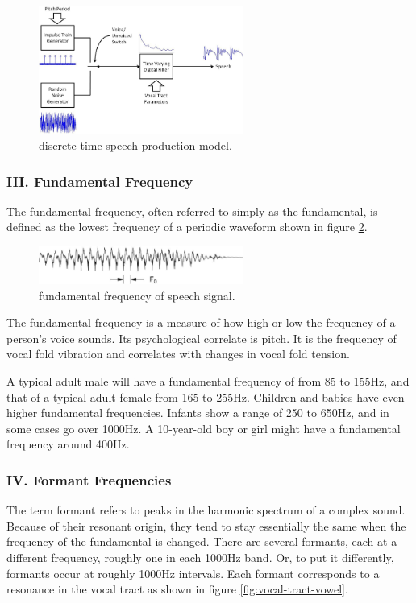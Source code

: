 \documentclass[12pt, a4paper, twoside]{report}
\begin{document}
\begin{figure}[!h]
	\centering
	\includegraphics[width=0.6\textwidth]
	{images/chapter2/discrete-speech-model}
	\caption{discrete-time speech production model.}
	\label{fig:discrete-speech-model}
\end{figure}

\subsubsection{III. Fundamental Frequency}
The fundamental frequency, often referred to simply as the fundamental, is defined as the lowest frequency of a periodic waveform shown in figure \ref{fig:fund-freq-speech}.

\begin{figure}[ht]
	\centering
	\includegraphics[width=0.6\textwidth]
	{images/chapter2/fund-freq-speech}
	\caption{fundamental frequency of speech signal.}
	\label{fig:fund-freq-speech}
\end{figure}

The fundamental frequency is a measure of how high or low the frequency of a person's voice sounds. Its psychological correlate is pitch. It is the frequency of vocal fold vibration and correlates with changes in vocal fold tension.
\par
A typical adult male will have a fundamental frequency of from 85 to 155Hz, and that of a typical adult female from 165 to 255Hz. Children and babies have even higher fundamental frequencies. Infants show a range of 250 to 650Hz, and in some cases go over 1000Hz. A 10-year-old boy or girl might have a fundamental frequency around 400Hz.

\subsubsection{IV. Formant Frequencies}
The term formant refers to peaks in the harmonic spectrum of a complex sound. Because of their resonant origin, they tend to stay essentially the same when the frequency of the fundamental is changed. There are several formants, each at a different frequency, roughly one in each 1000Hz band. Or, to put it differently, formants occur at roughly 1000Hz intervals. Each formant corresponds to a resonance in the vocal tract as shown in figure \ref{fig:vocal-tract-vowel}.
\end{document}
